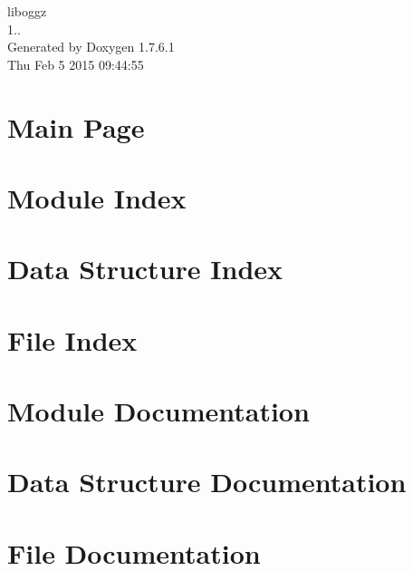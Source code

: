 \documentclass[a4paper]{book}
\begin{document}
\begin{titlepage}
\vspace*{7cm}
\begin{center}
{\Large liboggz \\[1ex]\large 1.. }\\
\vspace*{1cm}
{\large \-Generated by Doxygen 1.7.6.1}\\
\vspace*{0.5cm}
{\small Thu Feb 5 2015 09:44:55}\\
\end{center}
\end{titlepage}
\clearemptydoublepage
{}
\tableofcontents
\clearemptydoublepage
{}
\chapter{\-Main \-Page}
\label{index}
\chapter{\-Module \-Index}

\chapter{\-Data \-Structure \-Index}

\chapter{\-File \-Index}

\chapter{\-Module \-Documentation}











\chapter{\-Data \-Structure \-Documentation}

\chapter{\-File \-Documentation}












\printindex
\end{document}
